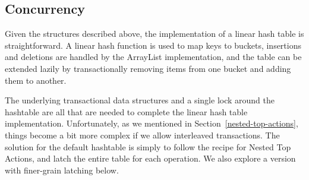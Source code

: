 \documentclass[10pt,letterpaper,twocolumn,english]{article}
\newcommand{\yad}{Lemon\xspace}
\begin{document}
\subsection{Concurrency}

Given the structures described above, the implementation of a linear
hash table is straightforward.  A linear hash function is used to map
keys to buckets, insertions and deletions are handled by the ArrayList
implementation, and the table can be extended lazily by
transactionally removing items from one bucket and adding them to
another.

The underlying transactional data structures and a
single lock around the hashtable are all that are needed
to complete the linear hash table implementation.  Unfortunately, as
we mentioned in Section~\ref{nested-top-actions}, things become a bit
more complex if we allow interleaved transactions.  The solution for
the default hashtable is simply to follow the recipe for Nested
Top Actions, and latch the entire table for each operation.
We also explore a version with finer-grain latching below.
\end{document}
